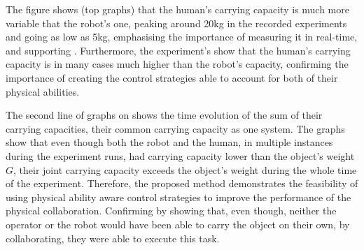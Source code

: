 The figure shows (top graphs) that the human's carrying capacity is much more variable that the robot's one, peaking around 20kg in the recorded experiments and going as low as 5kg, emphasising the importance of measuring it in real-time, and supporting . Furthermore, the experiment's show that the human's carrying capacity is in many cases much higher than the robot's capacity, confirming the importance of creating the control strategies able to account for both of their physical abilities. 


The second line of graphs on  shows the time evolution of the sum of their carrying capacities, their common carrying capacity as one system. The graphs show that even though both the robot and the human, in multiple instances during the experiment runs, had carrying capacity lower than the object's weight $G$, their joint carrying capacity exceeds the object's weight during the whole time of the experiment. Therefore, the proposed method demonstrates the feasibility of using physical ability aware control strategies to improve the performance of the physical collaboration. Confirming  by showing that, even though, neither the operator or the robot would have been able to carry the object on their own, by collaborating, they were able to execute this task.

